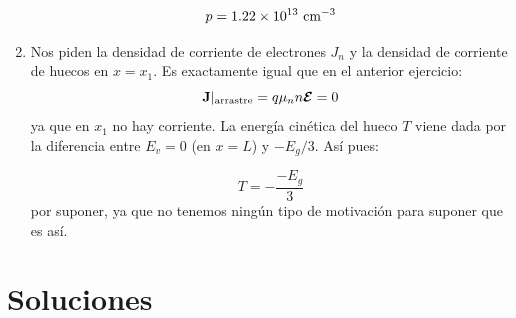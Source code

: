 \begin{texercise}
\begin{enumerate}[label=\alph*)]
		\begin{equation}
			p = 1.22 \times 10^{13} \ \text{cm}^{-3}
		\end{equation}
		\item Nos piden la densidad de corriente de electrones $J_n$ y la densidad de corriente de huecos en $x=x_1$. Es exactamente igual que en el anterior ejercicio:
		\begin{equation}
			\mathbf{J}|_{\text{{arrastre}}} = q \mu_n n \boldsymbol{\mathcal{E}} = 0
		\end{equation}
		ya que en $x_1$ no hay corriente. La energía cinética del hueco $T$ viene dada por la diferencia entre $E_v=0$ (en $x=L$) y $-E_g/3$. Así pues:

		\begin{equation}
			T = - \frac{-E_g}{3}
		\end{equation}
		por suponer, ya que no tenemos ningún tipo de motivación para suponer que es así. 

	\end{enumerate}
\end{texercise}


\tcbstoprecording

\newpage

\section{Soluciones}

\tcbinputrecords

















